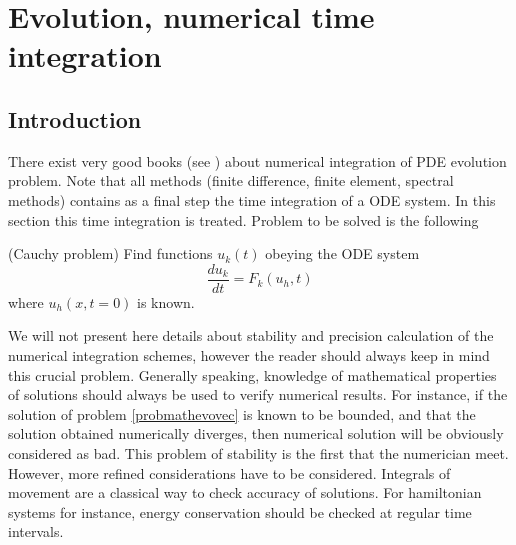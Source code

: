 \documentclass[12pt]{book}
\begin{document}
\section{Evolution, numerical time integration}\label{annexnum}
\subsection{Introduction}
There exist very good books 
(see \cite{ma:compu:garcia94,ma:compu:Press92,ma:compu:Parker89}) 
about numerical integration of PDE evolution problem. Note that all methods
(finite difference, finite element, spectral methods) contains as a final step
the time integration of a ODE system. In this section this time integration is
treated.  Problem to be solved is the following
\begin{prob}\label{probmathevovec} (Cauchy problem)
Find functions
$u_k(t)$ obeying the ODE system
\begin{equation}
\frac{d u_k}{dt}=F_k(u_h,t)
\end{equation}
where $u_h(x,t=0)$ is known. 
\end{prob}
We will not present here details about stability and precision calculation of
the numerical integration schemes, however the reader should always keep in
mind this crucial problem. Generally speaking, knowledge
of mathematical properties of solutions should always be used to verify
numerical results. For instance, if the solution of problem
\ref{probmathevovec} is known to be bounded, and that the solution obtained
numerically diverges, then numerical solution will be obviously considered as
bad. This problem of stability is the first that the numerician meet. However,
more refined considerations have to be considered. Integrals of movement are a
classical way to check accuracy of solutions. For hamiltonian systems for
instance, energy conservation should be checked at regular time intervals.
\end{document}
